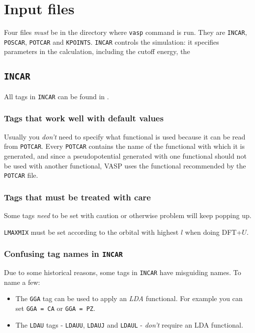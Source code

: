 \documentclass[hyperref, a4paper]{article}
\begin{document}
\section{Input files}

Four files \emph{must} be in the directory where \texttt{vasp} command is run. They are \texttt{INCAR}, \texttt{POSCAR}, \texttt{POTCAR} and \texttt{KPOINTS}.
\texttt{INCAR} controls the simulation: it specifies parameters in the calculation, including the cutoff energy, the 

\subsection{\texttt{INCAR}}

All tags in \texttt{INCAR} can be found in \cite{incar}.

\subsubsection{Tags that work well with default values}

Usually you \emph{don't} need to specify what functional is used because it can be read from \texttt{POTCAR}.
Every \texttt{POTCAR} contains the name of the functional with which it is generated, and since a pseudopotential generated with one functional should not be used with another functional, VASP uses the functional recommended by the \texttt{POTCAR} file.

\subsubsection{Tags that must be treated with care}

Some tags \emph{need} to be set with caution or otherwise problem will keep popping up.

\texttt{LMAXMIX} must be set according to the orbital with highest $l$ when doing DFT+$U$.

\subsubsection{Confusing tag names in \texttt{INCAR}}

Due to some historical reasons, some tags in \texttt{INCAR} have misguiding names.
To name a few:
\begin{itemize}
    \item The \texttt{GGA} tag can be used to apply an \emph{LDA} functional. For example you can set \texttt{GGA = CA} or \texttt{GGA = PZ}.
    \item The \texttt{LDAU} tags - \texttt{LDAUU}, \texttt{LDAUJ} and \texttt{LDAUL} - \emph{don't} require an LDA functional. 
\end{itemize}
\end{document}
